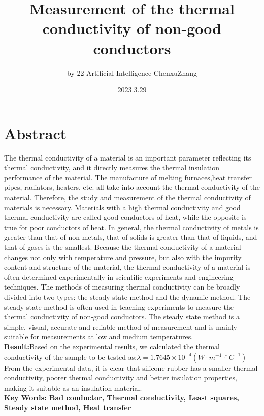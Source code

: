 \documentclass[UTF8]{article}
\title{Measurement of the thermal conductivity of non-good conductors}
\author{by 22 Artificial Intelligence ChenxuZhang}
\date{2023.3.29}
\begin{document}
	
	\fancyfoot[C]{\thepage}
	
	\maketitle
	\tableofcontents
	\newpage
	
	\section{Abstract}
The thermal conductivity of a material is an important parameter reflecting its thermal conductivity, and it directly measures the thermal insulation performance of the material. The manufacture of melting furnaces,heat transfer pipes, radiators, heaters, etc. all take into account the thermal conductivity of the material. Therefore, the study and measurement of the thermal conductivity of materials is necessary. Materials with a high thermal conductivity and good thermal conductivity are called good conductors of heat, while the opposite is true for poor conductors of heat. In general, the thermal conductivity of metals is greater than that of non-metals, that of solids is greater than that of liquids, and that of gases is the smallest. Because the thermal conductivity of a material changes not only with temperature and pressure, but also with the impurity content and structure of the material, the thermal conductivity of a material is often determined experimentally in scientific experiments and engineering techniques. The methods of measuring thermal conductivity can be broadly divided into two types: the steady state method and the dynamic method. The steady state method is often used in teaching experiments to measure the thermal conductivity of non-good conductors. The steady state method is a simple, visual, accurate and reliable method of measurement and is mainly suitable for measurements at low and medium temperatures.\\
	\textbf{Result:}Based on the experimental results, we calculated the thermal conductivity of the sample to be tested as:$\lambda  =  1.7645\times 10^{-4} \left ( W\cdot m^{-1}\cdot ^{\circ}C^{-1}    \right )$From the experimental data, it is clear that silicone rubber has a smaller thermal conductivity, poorer thermal conductivity and better insulation properties, making it suitable as an insulation material.
	\\
	\textbf{Key Words: Bad conductor, Thermal conductivity, Least squares, Steady state method, Heat transfer}
	
\end{document}
